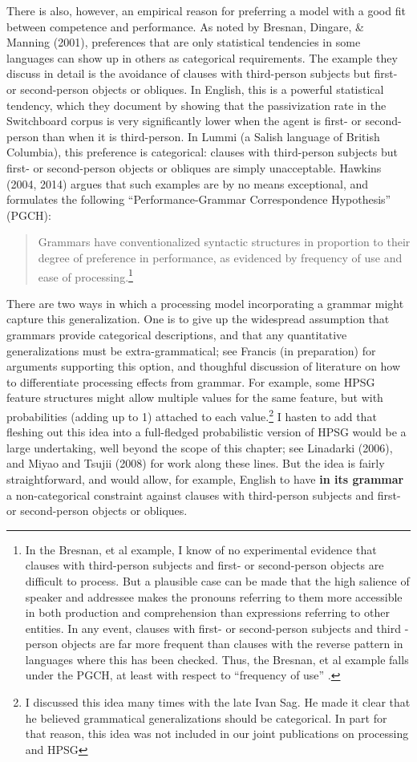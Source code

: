 \documentclass[a4paper]{article}
\begin{document}
There is also, however, an empirical reason for preferring a model with a good fit between competence and performance.  As noted by Bresnan, Dingare, \& Manning (2001), preferences that are only statistical tendencies in some languages can show up in others as categorical requirements.  The example they discuss in detail is the avoidance of clauses with third-person subjects but first- or second-person objects or obliques. In English, this is a powerful statistical tendency, which they document by showing that the passivization rate in the Switchboard corpus is very significantly lower when the agent is first- or second-person than when it is third-person.  In Lummi (a Salish language of British Columbia), this preference is categorical:  clauses with third-person subjects but first- or second-person objects or obliques are simply unacceptable.  Hawkins (2004, 2014) argues that such examples are by no means exceptional, and formulates the following ``Performance-Grammar Correspondence Hypothesis'' (PGCH):
\begin{quote}
Grammars  have  conventionalized  syntactic  structures  in  proportion   to their degree of preference in performance, as evidenced by frequency of use and ease of processing.\footnote {In the Bresnan, et al example, I know of no experimental evidence that clauses with third-person subjects and first- or second-person objects are difficult to process.  But a plausible case can be made that the high salience of speaker and addressee makes the pronouns referring to them more accessible in both production and comprehension than expressions referring to other entities.  In any event, clauses with first- or second-person subjects and third -person objects are far more frequent than clauses with the reverse pattern in languages where this has been checked.  Thus, the Bresnan, et al example falls under the PGCH, at least with respect to ``frequency of use'' .}
\end{quote}
There are two ways in which a processing model incorporating a grammar might capture this generalization.  One is to give up the widespread assumption that grammars provide categorical descriptions, and that any quantitative generalizations must be extra-grammatical; see Francis (in preparation) for arguments supporting this option, and thoughful discussion of literature on how to differentiate processing effects from grammar.  For example, some HPSG feature structures might allow multiple values for the same feature, but with probabilities (adding up to 1) attached to each value.\footnote{I discussed this idea many times with the late Ivan Sag.  He made it clear that he believed grammatical generalizations should be categorical.  In part for that reason, this idea was not included in our joint publications on processing and HPSG}  I hasten to add that fleshing out this idea into a full-fledged probabilistic version of HPSG would be a large undertaking, well beyond the scope of this chapter; see Linadarki (2006), and Miyao and Tsujii (2008) for work along these lines.  But the idea is fairly straightforward, and would allow, for example, English to have {\bf in its grammar} a non-categorical constraint against clauses with third-person subjects and first- or second-person objects or obliques.  
\end{document}
